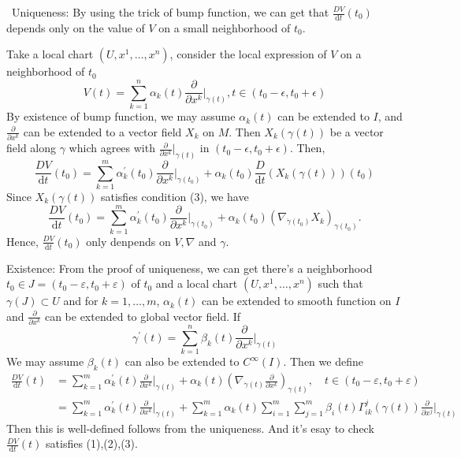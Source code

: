 \documentclass[12pt,a4paper]{book}
\newenvironment{prooff}{{\noindent\it\textcolor{cyan!40!black}{Proof}:}\,}{\par}
\newcommand{\dd}{\text{d}}
\newcommand{\p}{^{\prime}}
\theoremstyle{definition}
\begin{document}
\begin{prooff}
    Uniqueness:
    By using the trick of bump function, we can get that $\frac{DV}{\dd t}(t_0)$ depends only  on the value of $V$ on a small neighborhood of $t_0$.

    Take a local chart $(U,x^1,\dots,x^n)$, consider the local expression of $V$ on a neighborhood of $t_0$
    \begin{equation*}
        V(t)=\sum_{k=1}^n \alpha_k(t)\frac{\partial}{\partial x^k}\bigg|_{\gamma(t)}, t\in (t_0-\epsilon,t_0+\epsilon)
    \end{equation*}
    By existence of bump function, we may assume $\alpha_k(t)$ can be extended to $I$, and $\frac{\partial}{\partial x^k}$ can be extended to a
    vector field $X_k$ on $M$. Then $X_k(\gamma(t))$ be a vector field along $\gamma$ which agrees with $\frac{\partial}{\partial x^k}|_{\gamma(t)}$ in $(t_0-\epsilon,t_0+\epsilon)$. Then,
    \begin{equation*}
        \frac{DV}{\dd t}(t_0)=\sum_{k=1}^m  \alpha\p_k(t_0)\frac{\partial}{\partial x^k}\bigg|_{\gamma(t_0)}+\alpha_k(t_0)\frac{D}{\dd t}(X_k(\gamma(t)))(t_0)
    \end{equation*}
    Since $X_k(\gamma(t))$ satisfies condition (3), we have
    \begin{equation*}
        \frac{DV}{\dd t}(t_0)=\sum_{k=1}^m  \alpha\p_k(t_0)\frac{\partial}{\partial x^k}\bigg|_{\gamma(t_0)}+\alpha_k(t_0)(\nabla_{\dot{\gamma}(t_0)} X_k)_{\gamma(t_0)} .
    \end{equation*}
    Hence, $\frac{DV}{\dd t}(t_0)$ only denpends on $V,\nabla$ and $\gamma$.

    Existence: From the proof of uniqueness, we can get there's a neighborhood $t_0\in J=(t_0-\varepsilon,t_0+\varepsilon)$ of $t_0$ and a local chart $(U,x^1,\dots,x^n)$ such that
    $\gamma(J)\subset U$ and for $k=1,\dots,m$, $\alpha_k(t)$ can be extended to smooth function on $I$ and $\frac{\partial}{\partial x^k}$ can be extended to global vector field.
    If
    \begin{equation*}
        \gamma\p(t)=\sum_{k=1}^n \beta_k(t)\frac{\partial}{\partial x^k}\bigg|_{\gamma(t)}
    \end{equation*}
    We may assume $\beta_k(t)$ can also be extended to $C^{\infty}(I)$. Then we define
    \begin{align*}
        \frac{DV}{\dd t}(t) & =\sum_{k=1}^m  \alpha\p_k(t)\frac{\partial}{\partial x^k}\bigg|_{\gamma(t)}  +\alpha_k(t)(\nabla_{\dot{\gamma}(t)}\frac{\partial}{\partial x^k})_{\gamma(t)} , \quad t\in (t_0-\varepsilon,t_0+\varepsilon)      \\
                            & =\sum_{k=1}^m  \alpha\p_k(t)\frac{\partial}{\partial x^k}\bigg|_{\gamma(t)}  +\sum_{k=1}^m \alpha_k(t)\sum_{i=1}^m\sum_{j=1}^m \beta_i(t)\Gamma_{ik}^j(\gamma(t))\frac{\partial}{\partial x^j}\bigg|_{\gamma(t)}
    \end{align*}
    Then this is well-defined follows from the uniqueness. And it's esay to check $  \frac{DV}{\dd t}(t)$ satisfies (1),(2),(3).
\end{prooff}
\end{document}
